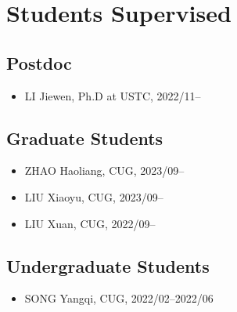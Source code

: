 \section{Students Supervised}

\subsection{Postdoc}
\begin{itemize}
\item LI Jiewen, Ph.D at USTC, 2022/11--
\end{itemize}

\subsection{Graduate Students}
\begin{itemize}
\item ZHAO Haoliang, CUG, 2023/09--
\item LIU Xiaoyu, CUG, 2023/09--
\item LIU Xuan, CUG, 2022/09--
\end{itemize}

\subsection{Undergraduate Students}
\begin{itemize}
\item SONG Yangqi, CUG, 2022/02--2022/06
\end{itemize}
